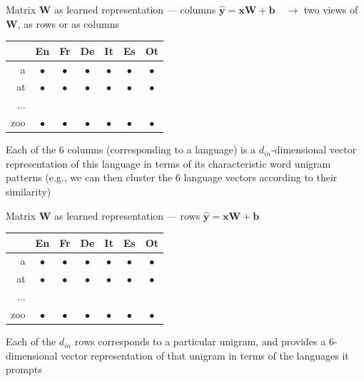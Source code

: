 \documentclass[12pt,aspectratio=169,handout]{beamer}
\begin{document}
\begin{frame}{Matrix $\bm{W}$ as learned representation --- columns}
	$\bm{\hat{y}} = \bm{x} \bm{W} + \bm{b} \quad \to$ two views of $\bm{W}$, as rows or as columns
	
	\begin{tabular}{r|cccccc}
		& En & Fr & De & It & Es & Ot \\ \midrule
		a & $\bullet$ & $\bullet$ & $\bullet$ & $\bullet$ & $\bullet$ & $\bullet$ \\
		at & $\bullet$ & $\bullet$ & $\bullet$ & $\bullet$ & $\bullet$ & $\bullet$ \\
		... & & & & & & \\
		zoo & $\bullet$ & $\bullet$ & $\bullet$ & $\bullet$ & $\bullet$ & $\bullet$ \\
	\end{tabular}
	
	\pause
	Each of the 6 columns (corresponding to a language) is a $d_{in}$-dimensional vector representation of this language in terms of its characteristic word unigram patterns (e.g., we can then cluster the 6 language vectors according to their similarity)
	
	
\end{frame}

\begin{frame}{Matrix $\bm{W}$ as learned representation --- rows}
	$\bm{\hat{y}} = \bm{x} \bm{W} + \bm{b}$
	
	\begin{tabular}{r|cccccc}
		& En & Fr & De & It & Es & Ot \\ \midrule
		a & $\bullet$ & $\bullet$ & $\bullet$ & $\bullet$ & $\bullet$ & $\bullet$ \\
		at & $\bullet$ & $\bullet$ & $\bullet$ & $\bullet$ & $\bullet$ & $\bullet$ \\
		... & & & & & & \\
		zoo & $\bullet$ & $\bullet$ & $\bullet$ & $\bullet$ & $\bullet$ & $\bullet$ \\
	\end{tabular}
	
	Each of the $d_{in}$ rows corresponds to a particular unigram, and provides a 6-dimensional vector
	representation of that unigram in terms of the languages it prompts
	
\end{frame}
\end{document}
